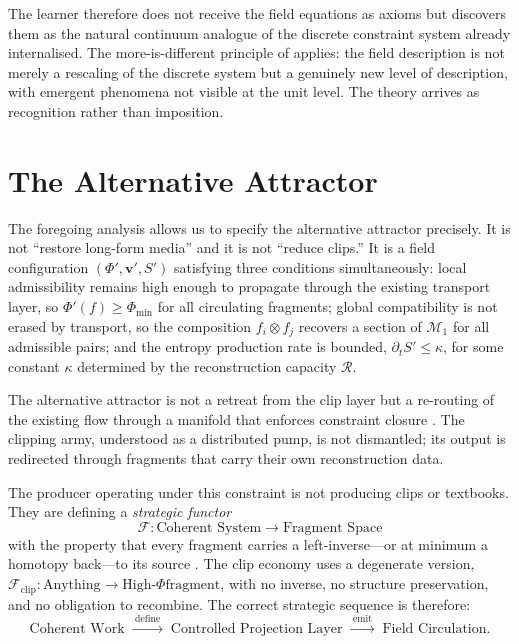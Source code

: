 \documentclass{amsart}
\theoremstyle{plain}
\theoremstyle{definition}
\theoremstyle{remark}
\newcommand{\scalar}{\Phi}
\newcommand{\vfield}{\mathbf{v}}
\newcommand{\entr}{S}
\newcommand{\Man}{\mathcal{M}}
\newcommand{\Rec}{\mathcal{R}}
\newcommand{\tensor}{\otimes}
\begin{document}
The learner therefore does not receive the field equations as axioms but discovers
them as the natural continuum analogue of the discrete constraint system already
internalised.  The more-is-different principle of \cite{anderson1972} applies: the
field description is not merely a rescaling of the discrete system but a genuinely
new level of description, with emergent phenomena not visible at the unit level.
The theory arrives as recognition rather than imposition.

\section{The Alternative Attractor}
\label{sec:attractor}

The foregoing analysis allows us to specify the alternative attractor precisely.
It is not ``restore long-form media'' and it is not ``reduce clips.''  It is a
field configuration $(\scalar', \vfield', \entr')$ satisfying three conditions
simultaneously: local admissibility remains high enough to propagate through the
existing transport layer, so $\scalar'(f) \geq \scalar_{\min}$ for all circulating
fragments; global compatibility is not erased by transport, so the composition
$f_i \tensor f_j$ recovers a section of $\Man_1$ for all admissible pairs; and the
entropy production rate is bounded, $\partial_t \entr' \leq \kappa$, for some
constant $\kappa$ determined by the reconstruction capacity $\Rec$.

The alternative attractor is not a retreat from the clip layer but a re-routing of
the existing flow through a manifold that enforces constraint closure
\cite{prigogine1984,strogatz2018}.  The clipping army, understood as a distributed
pump, is not dismantled; its output is redirected through fragments that carry
their own reconstruction data.

The producer operating under this constraint is not producing clips or textbooks.
They are defining a \emph{strategic functor}
\[
  \mathcal{F}\colon \text{Coherent System} \to \text{Fragment Space}
\]
with the property that every fragment carries a left-inverse---or at minimum a
homotopy back---to its source \cite{maclane1998,spivak2014}.  The clip economy
uses a degenerate version,
$\mathcal{F}_{\text{clip}}\colon \text{Anything} \to \text{High-}\scalar\text{
fragment}$,
with no inverse, no structure preservation, and no obligation to recombine.  The
correct strategic sequence is therefore:
\begin{equation}
  \label{eq:strategic-sequence}
  \text{Coherent Work}
  \;\xrightarrow{\;\text{define}\;}\;
  \text{Controlled Projection Layer}
  \;\xrightarrow{\;\text{emit}\;}\;
  \text{Field Circulation.}
\end{equation}
\end{document}
